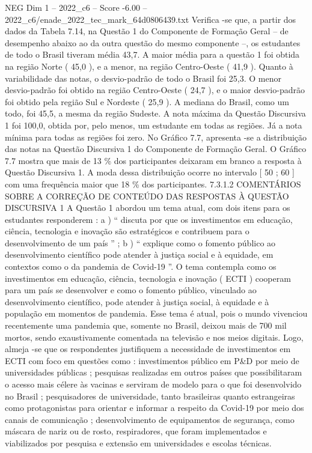 \begin{textsample}{NEG Dim 1 – 2022\_c6 – Score -6.00 – 2022\_c6/enade\_2022\_tec\_mark\_64d0806439.txt}
Verifica -se que, a partir dos dados da Tabela 7.14, na Questão 1 do Componente de Formação Geral – de desempenho abaixo ao da outra questão do mesmo componente –, os estudantes de todo o Brasil tiveram média 43,7.
A maior média para a questão 1 foi obtida na região Norte ( 45,0 ), e a menor, na região Centro-Oeste ( 41,9 ).
Quanto à variabilidade das notas, o desvio-padrão de todo o Brasil foi 25,3.
O menor desvio-padrão foi obtido na região Centro-Oeste ( 24,7 ), e o maior desvio-padrão foi obtido pela região Sul e Nordeste ( 25,9 ).
A mediana do Brasil, como um todo, foi 45,5, a mesma da região Sudeste.
A nota máxima da Questão Discursiva 1 foi 100,0, obtida por, pelo menos, um estudante em todas as regiões.
Já a nota mínima para todas as regiões foi zero.
No Gráfico 7.7, apresenta -se a distribuição das notas na Questão Discursiva 1 do Componente de Formação Geral.
O Gráfico 7.7 mostra que mais de 13 \% dos participantes deixaram em branco a resposta à Questão Discursiva 1.
A moda dessa distribuição ocorre no intervalo [ 50 ; 60 ] com uma frequência maior que 18 \% dos participantes. 7.3.1.2 COMENTÁRIOS SOBRE A CORREÇÃO DE CONTEÚDO DAS RESPOSTAS À QUESTÃO DISCURSIVA 1 A Questão 1 abordou um tema atual, com dois itens para os estudantes responderem : a ) “ discuta por que os investimentos em educação, ciência, tecnologia e inovação são estratégicos e contribuem para o desenvolvimento de um país ” ; b ) “ explique como o fomento público ao desenvolvimento científico pode atender à justiça social e à equidade, em contextos como o da pandemia de Covid-19 ”.
O tema contempla como os investimentos em educação, ciência, tecnologia e inovação ( ECTI ) cooperam para um país se desenvolver e como o fomento público, vinculado ao desenvolvimento científico, pode atender à justiça social, à equidade e à população em momentos de pandemia.
Esse tema é atual, pois o mundo vivenciou recentemente uma pandemia que, somente no Brasil, deixou mais de 700 mil mortos, sendo exaustivamente comentada na televisão e nos meios digitais.
Logo, almeja -se que os respondentes justifiquem a necessidade de investimentos em ECTI com foco em questões como : investimentos público em P\&D por meio de universidades públicas ; pesquisas realizadas em outros países que possibilitaram o acesso mais célere às vacinas e serviram de modelo para o que foi desenvolvido no Brasil ; pesquisadores de universidade, tanto brasileiras quanto estrangeiras como protagonistas para orientar e informar a respeito da Covid-19 por meio dos canais de comunicação ; desenvolvimento de equipamentos de segurança, como máscara de nariz ou de rosto, respiradores, que foram implementados e viabilizados por pesquisa e extensão em universidades e escolas técnicas.

\end{textsample}
